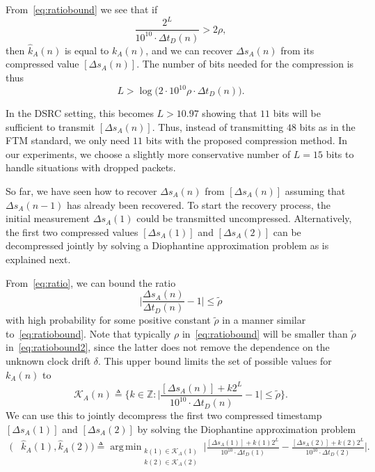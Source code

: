 \documentclass[12pt,journal,final,onecolumn]{IEEEtran}
\newcommand{\mc}[1]{\mathcal{#1}}
\newcommand{\defeq}{\mathrel{\triangleq}}
\newcommand{\Z}{\mathbb{Z}}
\DeclareMathOperator*{\argmin}{arg\,min}
\theoremstyle{definition}
\theoremstyle{myremark}
\newcommand{\dtd}{\Delta t_D}
\newcommand{\dsa}{\Delta s_A}
\begin{document}
From~\eqref{eq:ratiobound} we see that if
\begin{equation*}
    \frac{2^L}{10^{10}\cdot\dtd(n)} > 2\rho,
\end{equation*}
then $\hat{k}_A(n)$ is equal to $k_A(n)$, and we can recover $\dsa(n)$ from its
compressed value $[\dsa(n)]$. The number of bits needed for the compression is
thus
\begin{equation*}
    L > \log\bigl(2\cdot 10^{10}\rho\cdot\dtd(n)\bigr).
\end{equation*}

In the DSRC setting, this becomes $L > 10.97$ showing that $11$ bits will be
sufficient to transmit $[\dsa(n)]$. Thus, instead of transmitting $48$ bits as
in the FTM standard, we only need $11$ bits with the proposed compression
method. In our experiments, we choose a slightly more conservative number of $L
= 15$ bits to handle situations with dropped packets.

So far, we have seen how to recover $\dsa(n)$ from $[\dsa(n)]$ assuming that
$\dsa(n-1)$ has already been recovered. To start the recovery process, the
initial measurement $\dsa(1)$ could be transmitted uncompressed. Alternatively,
the first two compressed values $[\dsa(1)]$ and $[\dsa(2)]$ can be decompressed
jointly by solving a Diophantine approximation problem as is explained next.

From~\eqref{eq:ratio}, we can bound the ratio
\begin{equation}
    \label{eq:ratiobound2}
    \bigg\lvert \frac{\dsa(n)}{\dtd(n)}-1 \bigg\rvert \leq \tilde{\rho}
\end{equation}
with high probability for some positive constant $\tilde{\rho}$ in a manner
similar to~\eqref{eq:ratiobound}.  Note that typically $\rho$
in~\eqref{eq:ratiobound} will be smaller than $\tilde{\rho}$
in~\eqref{eq:ratiobound2}, since the latter does not remove the dependence on
the unknown clock drift $\delta$. This upper bound limits the set of possible
values for $k_A(n)$ to
\begin{equation*}
    \mc{K}_A(n) \defeq
    \biggl\{ k\in\Z: 
        \bigg\lvert \frac{[\dsa(n)]+k2^L}{10^{10}\cdot\dtd(n)}-1 \bigg\rvert 
        \leq \tilde{\rho} 
    \biggr\}.
\end{equation*}
We can use this to jointly decompress the first two compressed timestamp
$[\dsa(1)]$ and $[\dsa(2)]$ by solving the Diophantine approximation problem
\begin{align*}
    \bigl( & \hat{k}_A(1), \hat{k}_A(2)\bigr) 
    \defeq \argmin_{\substack{k(1)\in\mc{K}_A(1) \\ k(2)\in\mc{K}_A(2)}}
    \bigg\lvert 
    \frac{[\dsa(1)]+k(1)2^L}{10^{10}\cdot\dtd(1)}
    -\frac{[\dsa(2)]+k(2)2^L}{10^{10}\cdot\dtd(2)} 
    \bigg\rvert.
\end{align*}
\end{document}
